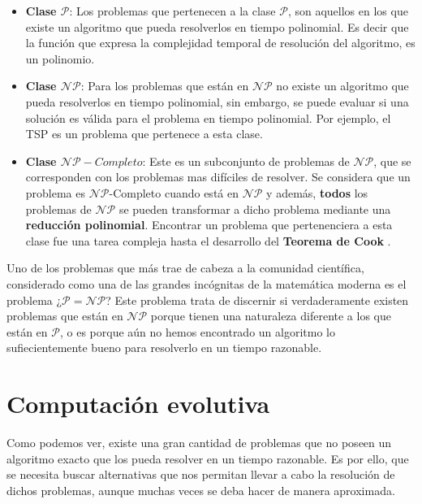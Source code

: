 \begin{itemize}
    \item \textbf{Clase $\mathcal{P}$}: Los problemas que pertenecen a la clase $\mathcal{P}$, son aquellos en los que existe un algoritmo que pueda resolverlos en tiempo polinomial. Es decir que la función que expresa la complejidad temporal de resolución del algoritmo, es un polinomio.
    \item \textbf{Clase $\mathcal{NP}$}: Para los problemas que están en $\mathcal{NP}$ no existe un algoritmo que pueda resolverlos en tiempo polinomial, sin embargo, se puede evaluar si una solución es válida para el problema en tiempo polinomial. Por ejemplo, el TSP es un problema que pertenece a esta clase.
    \item \textbf{Clase $\mathcal{NP}-Completo$}: Este es un subconjunto de problemas de $\mathcal{NP}$, que se corresponden con los problemas mas difíciles de resolver. Se considera que un problema es $\mathcal{NP}$-Completo cuando está en $\mathcal{NP}$ y además, \textbf{todos} los problemas de $\mathcal{NP}$ se pueden transformar a dicho problema mediante una \textbf{reducción polinomial}. Encontrar un problema que pertenenciera a esta clase fue una tarea compleja hasta el desarrollo del \textbf{Teorema de Cook} \cite{garey2002computers}.
\end{itemize}

Uno de los problemas que más trae de cabeza a la comunidad científica, considerado como una de las grandes incógnitas de la matemática moderna es el problema ¿$\mathcal{P} = \mathcal{NP}$? Este problema trata de discernir si verdaderamente existen problemas que están en $\mathcal{NP}$ \cite{baker1975relativizations} porque tienen una naturaleza diferente a los que están en $\mathcal{P}$, o es porque aún no hemos encontrado un algoritmo lo sufiecientemente bueno para resolverlo en un tiempo razonable.

\section{Computación evolutiva}
\label{1:sec:2}

Como podemos ver, existe una gran cantidad de problemas que no poseen un algoritmo exacto que los pueda resolver en un tiempo razonable. Es por ello, que se necesita buscar alternativas que nos permitan llevar a cabo la resolución de dichos problemas, aunque muchas veces se deba hacer de manera aproximada. \\

